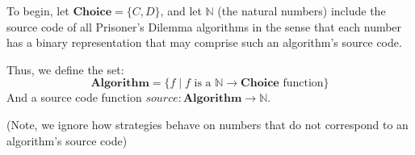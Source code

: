 To begin, let $\textbf{Choice} = \{C,D\}$, and let $\mathbb{N}$ (the natural numbers) include the source code of all Prisoner's Dilemma algorithms in the sense that each number has a binary representation that may comprise such an algorithm's source code.

Thus, we define the set:
\begin{equation*}
    \textbf{Algorithm} = \{f \mid f \text{ is a } \mathbb{N} \rightarrow \textbf{Choice} \text{ function}\}
\end{equation*}
And a source code function $source: \textbf{Algorithm} \rightarrow \mathbb{N}$.

(Note, we ignore how strategies behave on numbers that do not correspond to an algorithm's source code)